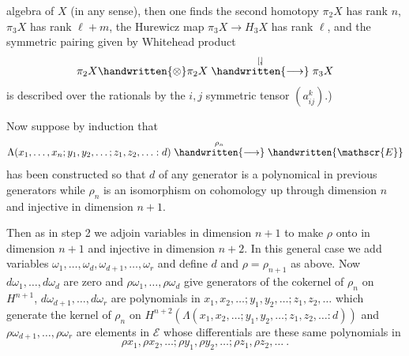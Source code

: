 algebra of $X$ (in any sense), then one finds the second homotopy  $\pi_2 X$ has rank $n$, $\pi_3 X$ has rank $\ell+m$, the Hurewicz map $\pi_3 X\to H_3 X$ has rank $\ell$, and the symmetric pairing given by Whitehead product
\[
 \pi_2 X\handwritten{\otimes}\pi_2 X\mathrel{\overset{[,\!]}{\handwritten{\longrightarrow}}}\pi_3 X
\]
is described over the rationals by the $i,j$ symmetric tensor $(a_{ij}^k)$.)

Now suppose by induction that
\[
 \Lambda(x_1,\ldots,x_n;y_1,y_2,\ldots;z_1,z_2,\ldots:d)
 \mathrel{\overset{\rho_n}{\handwritten{\longrightarrow}}}\handwritten{\mathscr{E}}
\]
has been constructed so that $d$ of any generator is a polynomical in previous generators while $\rho_n$ is an isomorphism on cohomology up through dimension $n$ and injective in dimension $n+1$.

Then as in step 2 we adjoin variables in dimension $n+1$ to make $\rho$ onto in dimension $n+1$ and injective in dimension $n+2$. In this general case we add variables $\omega_1,\ldots,\omega_d,\omega_{d+1},\ldots,\omega_r$ and define $d$ and $\rho=\rho_{n+1}$ as above. Now $d\omega_1,\ldots,d\omega_d$ are zero and $\rho\omega_1,\ldots,\rho\omega_d$ give generators of the cokernel of $\rho_n$ on $H^{n+1}$, $d\omega_{d+1},\ldots,d\omega_r$ are polynomials in $x_1,x_2,\ldots;y_1,y_2,\ldots;z_1,z_2,\ldots$ which generate the kernel of $\rho_n$ on $H^{n+2}(\Lambda(x_1,x_2,\ldots;y_1,y_2,\ldots;z_1,z_2,\ldots:d))$ and $\rho\omega_{d+1},\ldots,\rho\omega_r$ are elements in $\mathcal{E}$ whose differentials are these same polynomials in
\[
 \rho x_1,\rho x_2,\ldots;\rho y_1,\rho y_2,\ldots;\rho z_1,\rho z_2,\ldots\ .
\]

